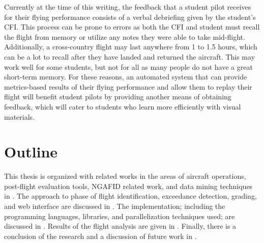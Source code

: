     Currently at the time of this writing, the feedback that a student pilot receives for their flying performance consists of a verbal debriefing given by the student's CFI.  This process can be prone to errors as both the CFI and student must recall the flight from memory or utilize any notes they were able to take mid-flight.  Additionally, a cross-country flight may last anywhere from 1 to 1.5 hours, which can be a lot to recall after they have landed and returned the aircraft.  This may work well for some students, but not for all as many people do not have a great short-term memory.  For these reasons, an automated system that can provide metrics-based results of their flying performance and allow them to replay their flight will benefit student pilots by providing another means of obtaining feedback, which will cater to students who learn more efficiently with visual materials.


\section{Outline} \label{sec:outline}

	This thesis is organized with related works in the areas of aircraft operations, post-flight evaluation tools, NGAFID related work, and data mining techniques in .  The approach to phase of flight identification, exceedance detection, grading, and web interface are discussed in .  The implementation; including the programming languages, libraries, and parallelization techniques used; are discussed in .  Results of the flight analysis are given in .  Finally, there is a conclusion of the research and a discussion of future work in .
    
    
    
